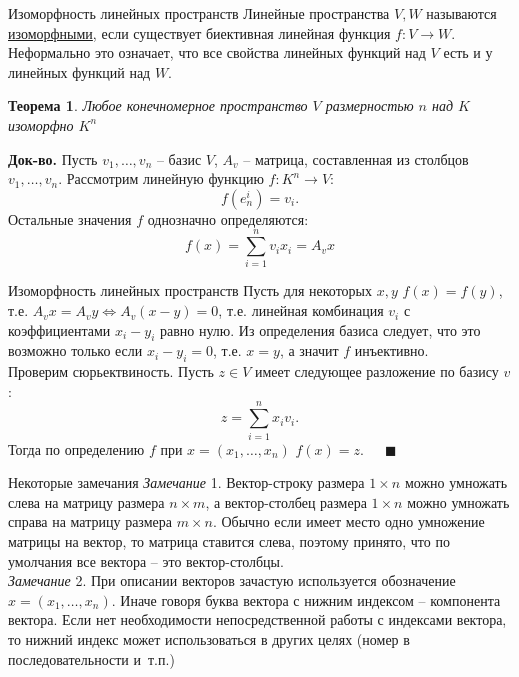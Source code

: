 \documentclass[10pt, handout]{beamer}
\newcounter{thm}
\newtheorem{theorem_ru}[thm]{Теорема}
\begin{document}
\begin{frame}{Изоморфность линейных пространств}
Линейные пространства $V, W$ называются \underline{изоморфными}, если существует биективная линейная функция $f:V\rightarrow W$.\\
\pause
\vspace{1em}
Неформально это означает, что все свойства линейных функций над $V$ есть и у линейных функций над $W$.\\
\pause
\begin{theorem_ru}
Любое конечномерное пространство $V$ размерностью $n$ над $K$ изоморфно $K^n$
\end{theorem_ru}
\pause
\textbf{Док-во.} Пусть $v_1, \ldots, v_n$ -- базис $V$, $A_v$ -- матрица, составленная из столбцов $v_1, \ldots, v_n$. Рассмотрим линейную функцию $f:K^n\rightarrow V$:
$$
f(e_n^i)=v_i.
$$
\pause
Остальные значения $f$ однозначно определяются:
$$
f(x)=\sum_{i=1}^nv_ix_i=A_vx
$$
\end{frame}

\begin{frame}{Изоморфность линейных пространств}
Пусть для некоторых $x, y$ $f(x)=f(y)$, т.е. $A_vx=A_vy\Leftrightarrow A_v(x-y)=0$, т.е. линейная комбинация $v_i$ с коэффициентами $x_i-y_i$ равно нулю. Из определения базиса следует, что это возможно только если $x_i-y_i=0$, т.е. $x=y$, а значит $f$ инъективно.\\
\pause
\vspace{1em}
Проверим сюрьектвиность. Пусть $z\in V$ имеет следующее разложение по базису $v$:
$$
z=\sum_{i=1}^nx_iv_i.
$$
\pause
Тогда по определению $f$ при $x=(x_1, \ldots, x_n)$ $f(x)=z$.~~~$\blacksquare$
\end{frame}


\begin{frame}{Некоторые замечания}
\textit{Замечание} 1. Вектор-строку размера $1\times n$ можно умножать слева на матрицу размера $n\times m$, а вектор-столбец размера $1\times n$ можно умножать справа на матрицу размера $m\times n$. Обычно если имеет место одно умножение матрицы на вектор, то матрица ставится слева, поэтому принято, что по умолчания все вектора -- это вектор-столбцы.\\
\pause
\vspace{1em}
\textit{Замечание} 2. При описании векторов зачастую используется обозначение $x=(x_1, \ldots, x_n)$. Иначе говоря буква вектора с нижним индексом -- компонента вектора. Если нет необходимости непосредственной работы с индексами вектора, то нижний индекс может использоваться в других целях (номер в последовательности и~т.п.)
\end{frame}
\end{document}
